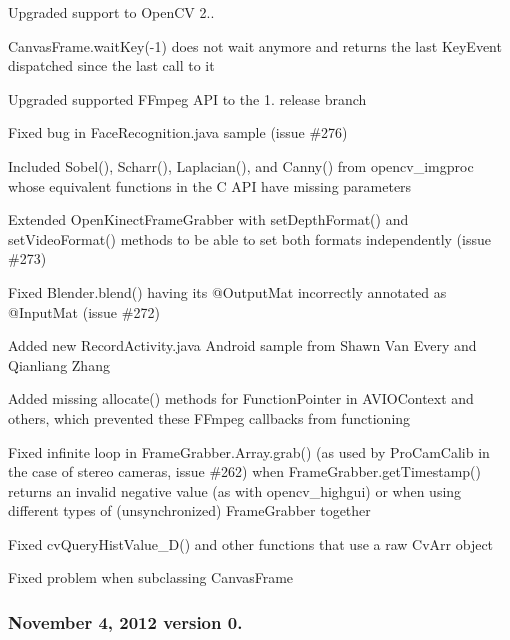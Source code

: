 \begin{DoxyItemize}
\item Upgraded support to Open\+C\+V 2..
\item {\ttfamily Canvas\+Frame.\+wait\+Key(-\/1)} does not wait anymore and returns the last {\ttfamily Key\+Event} dispatched since the last call to it
\item Upgraded supported F\+Fmpeg A\+P\+I to the 1. release branch
\item Fixed bug in {\ttfamily Face\+Recognition.\+java} sample (issue \#276)
\item Included {\ttfamily Sobel()}, {\ttfamily Scharr()}, {\ttfamily Laplacian()}, and {\ttfamily Canny()} from {\ttfamily opencv\+\_\+imgproc} whose equivalent functions in the C A\+P\+I have missing parameters
\item Extended {\ttfamily Open\+Kinect\+Frame\+Grabber} with {\ttfamily set\+Depth\+Format()} and {\ttfamily set\+Video\+Format()} methods to be able to set both formats independently (issue \#273)
\item Fixed {\ttfamily Blender.\+blend()} having its {\ttfamily @Output\+Mat} incorrectly annotated as {\ttfamily @Input\+Mat} (issue \#272)
\item Added new {\ttfamily Record\+Activity.\+java} Android sample from Shawn Van Every and Qianliang Zhang
\item Added missing {\ttfamily allocate()} methods for {\ttfamily Function\+Pointer} in {\ttfamily A\+V\+I\+O\+Context} and others, which prevented these F\+Fmpeg callbacks from functioning
\item Fixed infinite loop in {\ttfamily Frame\+Grabber.\+Array.\+grab()} (as used by Pro\+Cam\+Calib in the case of stereo cameras, issue \#262) when {\ttfamily Frame\+Grabber.\+get\+Timestamp()} returns an invalid negative value (as with {\ttfamily opencv\+\_\+highgui}) or when using different types of (unsynchronized) {\ttfamily Frame\+Grabber} together
\item Fixed {\ttfamily cv\+Query\+Hist\+Value\+\_\+D()} and other functions that use a raw {\ttfamily Cv\+Arr} object
\item Fixed problem when subclassing {\ttfamily Canvas\+Frame}
\end{DoxyItemize}

\subsubsection*{November 4, 2012 version 0.}


